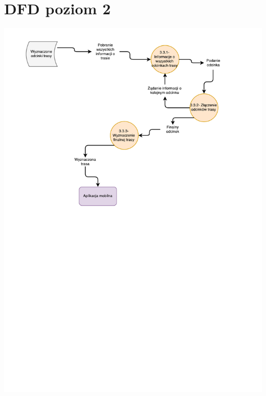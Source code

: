 \documentclass[11pt]{article}
\begin{document}
	\section{DFD poziom 2}
	\begin{center}
		\includegraphics[scale=0.8]{DFD33.pdf}
	\end{center}
	\newpage
\end{document}
